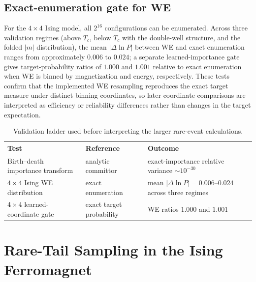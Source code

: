 \documentclass[a4paper,fleqn]{cas-sc}
\begin{document}
\subsection{Exact-enumeration gate for WE}\label{sec:gate}
For the $4\times4$ Ising model, all $2^{16}$ configurations can be enumerated. Across three
validation regimes (above $T_c$, below $T_c$ with the double-well structure, and the folded
$|m|$ distribution), the mean $|\Delta\ln P|$ between WE and exact enumeration ranges from
approximately $0.006$ to $0.024$; a separate learned-importance gate gives target-probability
ratios of $1.000$ and $1.001$ relative to exact enumeration when WE is binned by magnetization
and energy, respectively. These tests confirm that the implemented WE resampling reproduces the exact target measure
under distinct binning coordinates, so later coordinate comparisons are interpreted as
efficiency or reliability differences rather than changes in the target expectation.

\begin{table}[H]
\centering\small
\caption{Validation ladder used before interpreting the larger rare-event calculations.}
\label{tab:ladder}
\begin{tabular}{p{}p{}p{}}
\toprule
Test & Reference & Outcome \\
\midrule
Birth--death importance transform & analytic committor & exact-importance relative variance
$\sim10^{-30}$ \\
$4\times4$ Ising WE distribution & exact enumeration & mean $|\Delta\ln P|=0.006$--$0.024$
across three regimes \\
$4\times4$ learned-coordinate gate & exact target probability & WE ratios $1.000$ and
$1.001$ \\
\bottomrule
\end{tabular}
\end{table}

\FloatBarrier

\section{Rare-Tail Sampling in the Ising Ferromagnet}\label{sec:tail}
\end{document}
